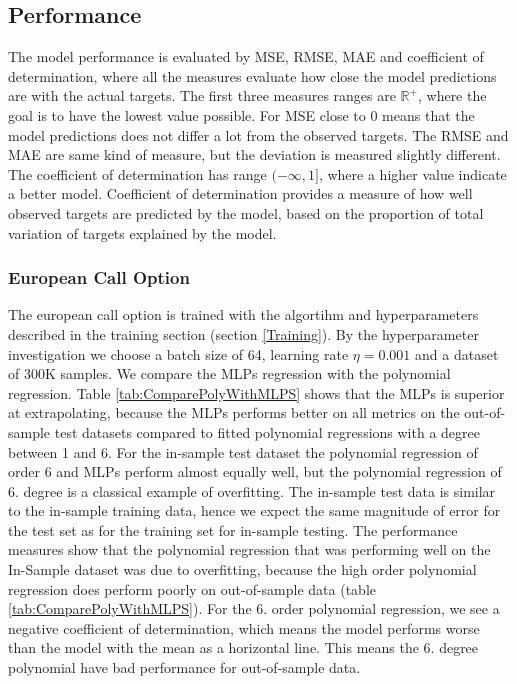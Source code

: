\subsection{Performance}
The model performance is evaluated by MSE, RMSE, MAE and coefficient of determination, where all the measures evaluate how close the model predictions are with the actual targets. The first three measures ranges are $\mathbb{R}^+$, where the goal is to have the lowest value possible. For MSE close to 0 means that the model predictions does not differ a lot from the observed targets. The RMSE and MAE are same kind of measure, but the deviation is measured slightly different. The coefficient of determination has range $(-\infty, 1]$, where a higher value indicate a better model. Coefficient of determination provides a measure of how well observed targets are predicted by the model, based on the proportion of total variation of targets explained by the model.

\subsubsection{European Call Option}
The european call option is trained with the algortihm and hyperparameters described in the training section (section \ref{Training}). By the hyperparameter investigation we choose a batch size of 64, learning rate $\eta = 0.001$ and a dataset of 300K samples. We compare the MLPs regression with the polynomial regression. Table \ref{tab:ComparePolyWithMLPS} shows that the MLPs is superior at extrapolating, because the MLPs performs better on all metrics on the out-of-sample test datasets compared to fitted polynomial regressions with a degree between 1 and 6. For the in-sample test dataset the polynomial regression of order 6 and MLPs perform almost equally well, but the polynomial regression of 6. degree is a classical example of overfitting. The in-sample test data is similar to the in-sample training data, hence we expect the same magnitude of error for the test set as for the training set for in-sample testing. The performance measures show that the polynomial regression that was performing well on the In-Sample dataset was due to overfitting, because the high order polynomial regression does perform poorly on out-of-sample data (table \ref{tab:ComparePolyWithMLPS}). For the 6. order polynomial regression, we see a negative coefficient of determination, which means the model performs worse than the model with the mean as a horizontal line. This means the 6. degree polynomial have bad performance for out-of-sample data. \\

